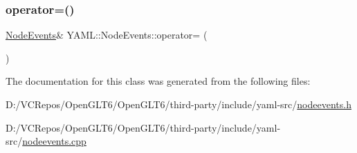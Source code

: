 \mbox{\label{class_y_a_m_l_1_1_node_events_a7ca672a0b0c4dbfc598ade293eb30428}} 
\subsubsection{\texorpdfstring{operator=()}{operator=()}\hspace{0.1cm}{\footnotesize\ttfamily [2/2]}}
{\footnotesize\ttfamily \mbox{\hyperlink{class_y_a_m_l_1_1_node_events}{Node\+Events}}\& Y\+A\+M\+L\+::\+Node\+Events\+::operator= (\begin{DoxyParamCaption}\item[{\mbox{\hyperlink{class_y_a_m_l_1_1_node_events}{Node\+Events}} \&\&}]{ }\end{DoxyParamCaption})\hspace{0.3cm}{\ttfamily [delete]}}



The documentation for this class was generated from the following files\+:\begin{DoxyCompactItemize}
\item 
D\+:/\+V\+C\+Repos/\+Open\+G\+L\+T6/\+Open\+G\+L\+T6/third-\/party/include/yaml-\/src/\mbox{\hyperlink{nodeevents_8h}{nodeevents.\+h}}\item 
D\+:/\+V\+C\+Repos/\+Open\+G\+L\+T6/\+Open\+G\+L\+T6/third-\/party/include/yaml-\/src/\mbox{\hyperlink{nodeevents_8cpp}{nodeevents.\+cpp}}\end{DoxyCompactItemize}

